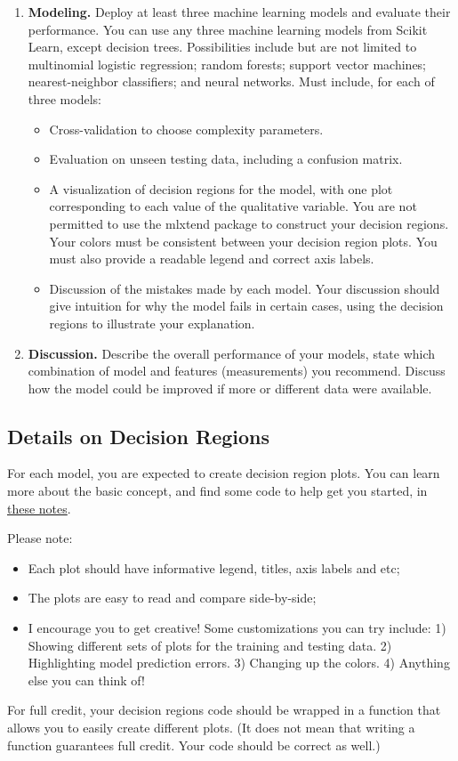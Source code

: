 \documentclass[12pt]{article}
\begin{document}
\begin{enumerate}
\item {\bf Modeling.} Deploy at least three machine learning models and evaluate their performance. You can use any three machine learning models from Scikit Learn, except decision trees. Possibilities include but are not limited to multinomial logistic regression; random forests; support vector machines; nearest-neighbor classifiers; and neural networks. Must include, for each of three models:
\begin{itemize}
\item Cross-validation to choose complexity parameters.
\item Evaluation on unseen testing data, including a confusion matrix.
\item A visualization of decision regions for the model, with one plot corresponding to each value of the qualitative variable. You are not permitted to use the mlxtend package to construct your decision regions. Your colors must be consistent between your decision region plots. You must also provide a readable legend and correct axis labels.
\item Discussion of the mistakes made by each model. Your discussion should give intuition for why the model fails in certain cases, using the decision regions to illustrate your explanation.
\end{itemize}
\item {\bf Discussion.} Describe the overall performance of your models, state which combination of model and features (measurements) you recommend. Discuss how the model could be improved if more or different data were available.
\end{enumerate}

\subsection*{Details on Decision Regions}
For each model, you are expected to create decision region plots. You can learn more about the basic concept, and find some code to help get you started, in \href{https://github.com/liaochunyang/PIC16/blob/main/PIC16A/Project/Decision_regions%20-%20Jupyter%20Notebook.pdf}{these notes}.

Please note:
\begin{itemize}
\item Each plot should have informative legend, titles, axis labels and etc;
\item The plots are easy to read and compare side-by-side;
\item I encourage you to get creative! Some customizations you can try include: 1) Showing different sets of plots for the training and testing data. 2) Highlighting model prediction errors. 3) Changing up the colors. 4) Anything else you can think of!
\end{itemize}
For full credit, your decision regions code should be wrapped in a function that allows you to easily create different plots. (It does not mean that writing a function guarantees full credit. Your code should be correct as well.)
\end{document}
